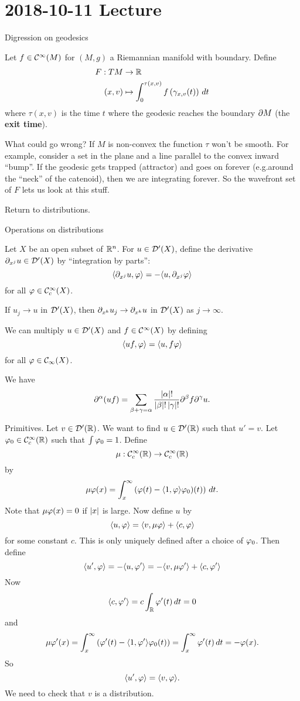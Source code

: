 \section{2018-10-11 Lecture}

Digression on geodesics

Let $f\in\mathcal{C}^\infty(M)$ for $(M,g)$ a Riemannian manifold with boundary.
Define
\begin{align*}
  F: TM &\to \mathbb{R} \\
  (x,v) &\mapsto \int_0^{\tau(x,v)} f\left( \gamma_{x,v}(t) \right) \, dt
\end{align*}
where $\tau(x,v)$ is the time $t$ where the geodesic reaches the boundary $\partial M$ (the \textbf{exit time}).

What could go wrong?
If $M$ is non-convex the function $\tau$ won't be smooth.
For example, consider a set in the plane and a line parallel to the convex inward ``bump''.
If the geodesic gets trapped (attractor) and goes on forever (e.g.\@ around the ``neck'' of the catenoid), then we are integrating forever.
So the wavefront set of $F$ lets us look at this stuff.

Return to distributions.

Operations on distributions

Let $X$ be an open subset of $\mathbb{R}^n$.
For $u\in\mathcal{D}'(X)$, define the derivative $\partial_{x^j}u\in\mathcal{D}'(X)$ by ``integration by parts'':
\[ {\left\langle \partial_{x^j}u,\varphi \right\rangle} = -{\left\langle u,\partial_{x^j}\varphi \right\rangle} \]
for all $\varphi\in\mathcal{C}_c^\infty(X)$.

\begin{thm}[Exercise]
  If $u_j\to u$ in $\mathcal{D}'(X)$, then $\partial_{x^k}u_j \to \partial_{x^k}u$ in $\mathcal{D}'(X)$ as $j\to\infty$.
\end{thm}

We can multiply $u\in\mathcal{D}'(X)$ and $f\in\mathcal{C}^\infty(X)$ by defining
\[ {\left\langle uf,\varphi \right\rangle} = {\left\langle u,f\varphi \right\rangle} \]
for all $\varphi\in\mathcal{C}_\infty(X)$.

\begin{thm}
  We have
  \[ \partial^\alpha(uf) = \sum_{\beta+\gamma=\alpha}\frac{\left\lvert \alpha \right\rvert!}{\left\lvert \beta \right\rvert!\left\lvert \gamma \right\rvert!}\partial^\beta f\partial^\gamma u. \]
\end{thm}

Primitives.
Let $v\in\mathcal{D}'(\mathbb{R})$.
We want to find $u\in\mathcal{D}'(\mathbb{R})$ such that $u'=v$.
Let $\varphi_0\in\mathcal{C}_c^\infty(\mathbb{R})$ such that $\int\varphi_0=1$.
Define
\[ \mu: \mathcal{C}_c^\infty(\mathbb{R}) \to \mathcal{C}_c^\infty(\mathbb{R}) \]
by
\[ \mu\varphi(x) = \int_x^\infty \left( \varphi(t)-{\left\langle 1,\varphi \right\rangle}\varphi_0)(t) \right) \, dt. \]
Note that $\mu\varphi(x)=0$ if $\left\lvert x \right\rvert$ is large.
Now define $u$ by
\begin{equation}
  {\left\langle u,\varphi\right\rangle} = {\left\langle v,\mu\varphi \right\rangle} + {\left\langle c,\varphi \right\rangle}
  \label{19:star}
\end{equation}
for some constant $c$.
This is only uniquely defined after a choice of $\varphi_0$.
Then define
\[ {\left\langle u',\varphi \right\rangle} = -{\left\langle u,\varphi' \right\rangle} = -{\left\langle v,\mu\varphi' \right\rangle} + {\left\langle c,\varphi' \right\rangle} \]
Now
\[ {\left\langle c,\varphi' \right\rangle} = c\int_{\mathbb{R}}\varphi'(t) \, dt = 0 \]
and
\[ \mu\varphi'(x) = \int_x^\infty \left( \varphi'(t)-{\left\langle 1,\varphi' \right\rangle}\varphi_0(t) \right) = \int_x^\infty \varphi'(t) \, dt = -\varphi(x). \]
So
\[ {\left\langle u',\varphi \right\rangle}={\left\langle v,\varphi \right\rangle}. \]
We need to check that $v$ is a distribution.

